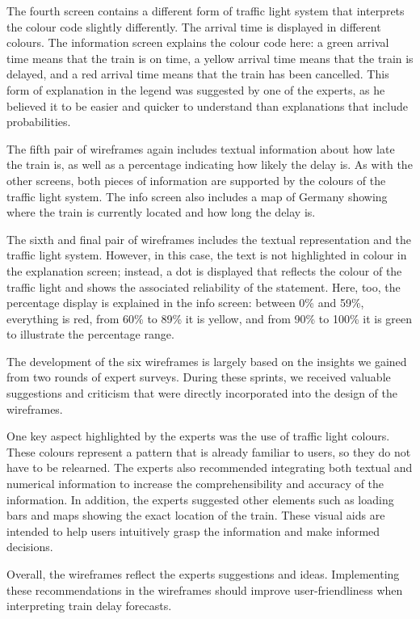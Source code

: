 \documentclass[final,journal,a4paper]{IEEEtran}
\begin{document}
The fourth screen contains a different form of traffic light system that interprets the colour code slightly differently. The arrival time is displayed in different colours. The information screen explains the colour code here: a green arrival time means that the train is on time, a yellow arrival time means that the train is delayed, and a red arrival time means that the train has been cancelled. This form of explanation in the legend was suggested by one of the experts, as he believed it to be easier and quicker to understand than explanations that include probabilities.

The fifth pair of wireframes again includes textual information about how late the train is, as well as a percentage indicating how likely the delay is. As with the other screens, both pieces of information are supported by the colours of the traffic light system. The info screen also includes a map of Germany showing where the train is currently located and how long the delay is.

The sixth and final pair of wireframes includes the textual representation and the traffic light system. However, in this case, the text is not highlighted in colour in the explanation screen; instead, a dot is displayed that reflects the colour of the traffic light and shows the associated reliability of the statement. Here, too, the percentage display is explained in the info screen: between 0\% and 59\%, everything is red, from 60\% to 89\% it is yellow, and from 90\% to 100\% it is green to illustrate the percentage range.

The development of the six wireframes is largely based on the insights we gained from two rounds of expert surveys. During these sprints, we received valuable suggestions and criticism that were directly incorporated into the design of the wireframes.

One key aspect highlighted by the experts was the use of traffic light colours. These colours represent a pattern that is already familiar to users, so they do not have to be relearned. The experts also recommended integrating both textual and numerical information to increase the comprehensibility and accuracy of the information. In addition, the experts suggested other elements such as loading bars and maps showing the exact location of the train. These visual aids are intended to help users intuitively grasp the information and make informed decisions.

Overall, the wireframes reflect the experts suggestions and ideas. Implementing these recommendations in the wireframes should improve user-friendliness when interpreting train delay forecasts.
\end{document}
